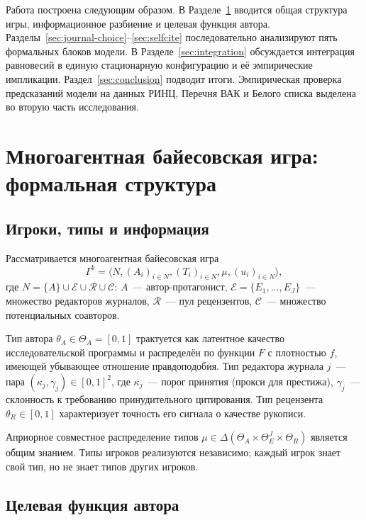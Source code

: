 \documentclass[12pt,a4paper]{article}
\theoremstyle{definition}
\begin{document}
Работа построена следующим образом. В Разделе~\ref{sec:model}
вводится общая структура игры, информационное разбиение и целевая
функция автора. Разделы~\ref{sec:journal-choice}--\ref{sec:selfcite}
последовательно анализируют пять формальных блоков модели. В
Разделе~\ref{sec:integration} обсуждается интеграция равновесий в
единую стационарную конфигурацию и её эмпирические импликации.
Раздел~\ref{sec:conclusion} подводит итоги. Эмпирическая проверка
предсказаний модели на данных РИНЦ, Перечня ВАК и Белого списка
выделена во вторую часть исследования.

\section{Многоагентная байесовская игра: формальная структура}
\label{sec:model}

\subsection{Игроки, типы и информация}

Рассматривается многоагентная байесовская игра
\begin{equation}
  \Gamma^{b} = \bigl\langle N, (A_i)_{i\in N}, (T_i)_{i\in N}, \mu,
  (u_i)_{i\in N} \bigr\rangle,
  \label{eq:game-structure}
\end{equation}
где $N = \{A\} \cup \mathcal{E} \cup \mathcal{R} \cup \mathcal{C}$:
$A$~--- автор-протагонист, $\mathcal{E} = \{E_1, \dots, E_J\}$~---
множество редакторов журналов, $\mathcal{R}$~--- пул рецензентов,
$\mathcal{C}$~--- множество потенциальных соавторов.

Тип автора $\theta_A \in \Theta_A = [0,1]$ трактуется как латентное
качество исследовательской программы и распределён по функции $F$ с
плотностью $f$, имеющей убывающее отношение правдоподобия. Тип
редактора журнала $j$~--- пара $(\kappa_j, \gamma_j) \in [0,1]^2$,
где $\kappa_j$~--- порог принятия (прокси для престижа),
$\gamma_j$~--- склонность к требованию принудительного цитирования.
Тип рецензента $\theta_R \in [0,1]$ характеризует точность его
сигнала о качестве рукописи.

Априорное совместное распределение типов $\mu \in \Delta(\Theta_A
\times \Theta_E^J \times \Theta_R)$ является общим знанием. Типы
игроков реализуются независимо; каждый игрок знает свой тип, но не
знает типов других игроков.

\subsection{Целевая функция автора}
\end{document}
